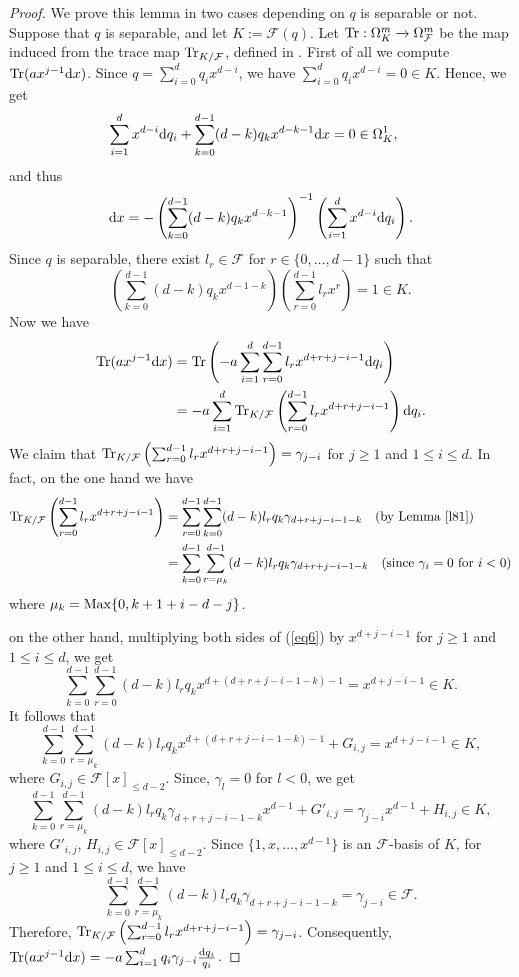 \documentclass[times,10pt]{amsart}
\newcommand{\dd}{{\rm d}}
\newcommand{\F}{\ensuremath{\mathcal{F}}}
\begin{document}
 \begin{proof}
      We prove this lemma in two cases depending on $q$ is separable or not. \\

       {Suppose that $q$ is separable, and let }$K:=\F(q)$.  Let  ${\rm Tr}: \Omega_K^m\xrightarrow{} \Omega_{\F}^m$ be  the map induced from the trace map ${\rm Tr}_{K/\F}$, defined in \cite[Section 2]{AAB}.     First of all we compute $ {\rm Tr}( ax^{j-1}\dd x)$.  Since $ q=\sum_{i=0}^{d}q_ix^{d-i}$, we have $\sum_{i=0}^{d} q_i x^{d-i}=0\in K$. Hence, we get 
\begin{align*}
\sum_{i=1}^{d}x^{d-i} \dd q_i&+ \sum_{k=0}^{d-1} (d-k)q_kx^{d-k-1}\dd x=0\in \Omega_K^1,
\end{align*}and thus$$\dd x= -\left( \sum_{k=0}^{d-1} (d-k) q_kx^{d-k-1}\right)^{-1} \left(\sum_{i=1}^{d} x^{d-i} \dd q_i\right).$$
Since $q$ is separable, there exist 
    $l_r\in \F$ for $r\in \{0,\ldots,d-1\}$ such that \begin{equation}\label{eq6}
     \left(\sum_{k=0}^{d-1}(d-k) q_k x^{d-1-k}\right)\left(\sum_{r=0}^{d-1} l_rx^r\right)=1\in K.
 \end{equation}  Now we have \begin{align*}
      {\rm Tr} ( a x^{j-1} \dd x)&= {\rm Tr} \left( -a\sum_{i=1}^{d} \sum_{r=0}^{d-1} l_r x^{d+r+j-i-1} \dd q_i\right)\\&= -a \sum_{i=1}^{d}{\rm Tr}_{K/\F}\left( \sum_{r=0}^{d-1} l_r x^{d+r+j-i-1}\right)\dd q_i.
 \end{align*}{We claim} that  $ {\rm Tr}_{K/\F}\left( \sum_{r=0}^{d-1} l_r x^{ d+r+j-i-1}\right)=\gamma_{j-i}$ for  $j\geq 1$ and $1\leq i\leq d$. {In fact, on the one hand we have} \begin{align*}
     {\rm Tr}_{K/\F}\left( \sum_{r=0}^{d-1} l_r x^{d+r+j-i-1}\right)&= \sum_{r=0}^{d-1} \sum_{k=0}^{d-1}(d-k)l_rq_k\gamma_{d+r+j-i-1-k}\quad \text{(by Lemma \ref{l81})}\\&= \sum_{k=0}^{d-1}\sum_{r=\mu_k}^{d-1}(d-k) l_r q_k \gamma_{d+r+j-i-1-k}\quad \text{(since $\gamma_i=0$ for $i<0$)}\end{align*} where $\mu_k={\rm Max}\{ 0, k+1+i-d-j\}$. 
     
 {on the other hand, multiplying} both sides of (\ref{eq6}) by $ x^{d+j-i-1} $ for $j\geq 1$ and $1\leq i\leq d$, we get$$\sum_{k=0}^{d-1}\sum_{r=0}^{d-1} (d-k)l_rq_kx^{d+(d+r+j-i-1-k)-1}= x^{d+j-i-1}\in K.$$It follows that$$\sum_{k=0}^{d-1}\sum_{r=\mu_k}^{d-1}(d-k) l_r q_k x^{d+(d+r+j-i-1-k)-1}+G_{i,j} = x^{d+j-i-1}\in K,$${where} $G_{i,j}\in \F[x]_{\leq d-2}$. {Since, $\gamma_{l}=0$ for $l<0$,} we get$$\sum_{k=0}^{d-1}\sum_{r=\mu_k}^{d-1} (d-k)l_r q_k \gamma_{d+r+j-i-1-k} x^{d-1}+G'_{i,j}= 
             \gamma_{j-i}x^{d-1}+H_{i,j}\in K,$$where $G'_{i,j}$, $H_{i,j}\in \F[x]_{\leq d-2}$. Since $\{1, x,\ldots,x^{d-1}\}$ is an  $\F$-basis of $K$,   for $j\geq 1$ and $1\leq i\leq d$, we have$$\sum_{k=0}^{d-1}\sum_{r=\mu_k}^{d-1}(d-k) l_r q_k \gamma_{d+r+j-i-1-k} = \gamma_{j-i}\in \F.$$ Therefore, ${\rm Tr}_{K/\F} \left( \sum_{r=0}^{d-1} l_r x^{d+r+j-i-1}\right) =\gamma_{j-i}$. Consequently, ${\rm Tr}(ax^{j-1} \dd x)= -a\sum_{i=1}^{d} q_i\gamma_{j-i}\frac{\dd q_i}{q_i}$. 
             

\end{proof}
\end{document}
